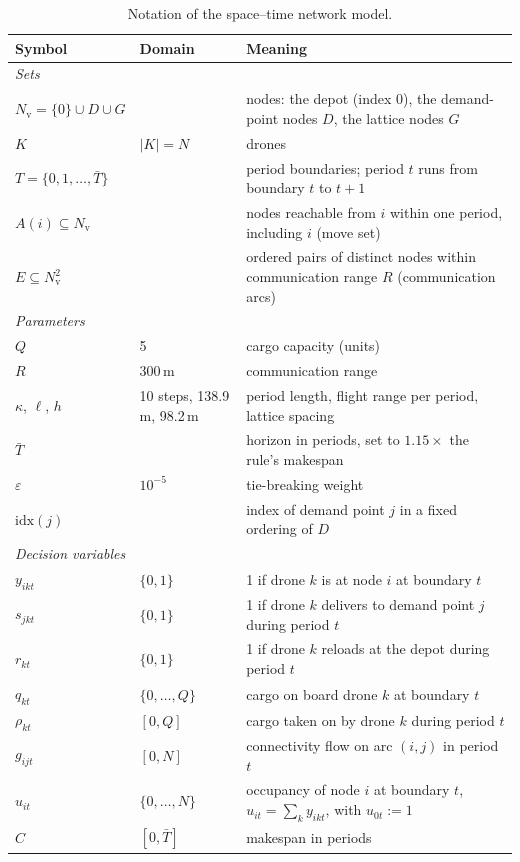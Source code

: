 \documentclass[final,5p,times,twocolumn]{elsarticle}
\begin{document}
\begin{table}[t]
\centering
\caption{Notation of the space--time network model.}
\label{tab:notation}
\small
\begin{tabular}{llp{9.6cm}}
\toprule
Symbol & Domain & Meaning \\
\midrule
\multicolumn{3}{l}{\emph{Sets}} \\
$N_{\mathrm{v}} = \{0\} \cup D \cup G$ & & nodes: the depot (index 0), the demand-point nodes $D$, the lattice nodes $G$ \\
$K$ & $|K| = N$ & drones \\
$T = \{0, 1, \dots, \bar T\}$ & & period boundaries; period $t$ runs from boundary $t$ to $t+1$ \\
$A(i) \subseteq N_{\mathrm{v}}$ & & nodes reachable from $i$ within one period, including $i$ (move set) \\
$E \subseteq N_{\mathrm{v}}^2$ & & ordered pairs of distinct nodes within communication range $R$ (communication arcs) \\
\midrule
\multicolumn{3}{l}{\emph{Parameters}} \\
$Q$ & 5 & cargo capacity (units) \\
$R$ & 300\,m & communication range \\
$\kappa$, $\ell$, $h$ & 10 steps, 138.9\,m, 98.2\,m & period length, flight range per period, lattice spacing \\
$\bar T$ & & horizon in periods, set to $1.15\times$ the rule's makespan \\
$\varepsilon$ & $10^{-5}$ & tie-breaking weight \\
$\mathrm{idx}(j)$ & & index of demand point $j$ in a fixed ordering of $D$ \\
\midrule
\multicolumn{3}{l}{\emph{Decision variables}} \\
$y_{ikt}$ & $\{0,1\}$ & 1 if drone $k$ is at node $i$ at boundary $t$ \\
$s_{jkt}$ & $\{0,1\}$ & 1 if drone $k$ delivers to demand point $j$ during period $t$ \\
$r_{kt}$ & $\{0,1\}$ & 1 if drone $k$ reloads at the depot during period $t$ \\
$q_{kt}$ & $\{0,\dots,Q\}$ & cargo on board drone $k$ at boundary $t$ \\
$\rho_{kt}$ & $[0,Q]$ & cargo taken on by drone $k$ during period $t$ \\
$g_{ijt}$ & $[0, N]$ & connectivity flow on arc $(i,j)$ in period $t$ \\
$u_{it}$ & $\{0,\dots,N\}$ & occupancy of node $i$ at boundary $t$, $u_{it} = \sum_k y_{ikt}$, with $u_{0t} := 1$ \\
$C$ & $[0,\bar T]$ & makespan in periods \\
\bottomrule
\end{tabular}
\end{table}
\end{document}
